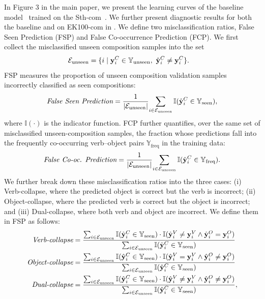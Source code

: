 In Figure 3 in the main paper, we present the learning curves of the baseline model~\cite{li2024c2c} trained on the Sth-com~\cite{li2024c2c}.
We further present diagnostic results for both the baseline and \ours{} on EK100-com in .
We define two misclassification ratios, False Seen Prediction (FSP) and False Co-occurrence Prediction (FCP).
We first collect the misclassified unseen composition samples into the set
\begin{align}
\mathcal{E}_{\mathrm{unseen}}
&= \{i \mid \mathbf{y}_i^C\in\mathbb{Y}_{\mathrm{unseen}},\ \hat{\mathbf{y}}_i^C\neq \mathbf{y}_i^C\}.
\end{align}
FSP measures the proportion of unseen composition validation samples incorrectly classified as seen compositions:
\begin{align}
\vspace{-3em}
\textit{False Seen Prediction}=\frac{1}{|\mathcal{E}_{\mathrm{unseen}}|}
{\sum_{i\in\mathcal{E}_{\mathrm{unseen}}}
\mathbb{I}(\hat{\y}^C_i \in \mathbb{Y}_{\text{seen}})},
\vspace{-.5em}
\end{align}
where $\mathbb{I}(\cdot)$ is the indicator function.
FCP further quantifies, over the same set of misclassified unseen-composition samples, the fraction whose predictions fall into the frequently co-occurring verb–object pairs $\mathbb{Y}_\text{freq}$ in the training data:
\begin{align}
\vspace{-1em}
\textit{False Co-oc. Prediction}=\frac{1}{|\mathcal{E}_{\mathrm{unseen}}|}{\sum_{i\in\mathcal{E}_{\mathrm{unseen}}} \mathbb{I}(\hat{\y}^C_i \in \mathbb{Y}_{\text{freq}})}.
\vspace{-1em}
\end{align}
We further break down these misclassification ratios into the three cases: (i) Verb-collapse, where the predicted object is correct but the verb is incorrect; (ii) Object-collapse, where the predicted verb is correct but the object is incorrect; and (iii) Dual-collapse, where both verb and object are incorrect.
We define them in FSP as follows:
\begin{align}
\textit{Verb-collapse}&=\frac{\sum_{i \in \mathcal{E}_{\mathrm{unseen}}} \mathbb{I}(\hat{\mathbf{y}}^C_i \in \mathbb{Y}_{\text{seen}}) \cdot \mathbb{I}(\hat{\mathbf{y}}^V_i \neq \mathbf{y}^V_i \land \hat{\mathbf{y}}^O_i = \mathbf{y}^O_i)}{\sum_{i \in \mathcal{E}_{\mathrm{unseen}}} \mathbb{I}(\hat{\mathbf{y}}^C_i \in \mathbb{Y}_{\text{seen}})}\\
\textit{Object-collapse}&=\frac{\sum_{i \in \mathcal{E}_{\mathrm{unseen}}} \mathbb{I}(\hat{\mathbf{y}}^C_i \in \mathbb{Y}_{\text{seen}}) \cdot \mathbb{I}(\hat{\mathbf{y}}^V_i = \mathbf{y}^V_i \land \hat{\mathbf{y}}^O_i \neq \mathbf{y}^O_i)}{\sum_{i \in \mathcal{E}_{\mathrm{unseen}}} \mathbb{I}(\hat{\mathbf{y}}^C_i \in \mathbb{Y}_{\text{seen}})}\\
\textit{Dual-collapse}&=\frac{\sum_{i \in \mathcal{E}_{\mathrm{unseen}}} \mathbb{I}(\hat{\mathbf{y}}^C_i \in \mathbb{Y}_{\text{seen}}) \cdot \mathbb{I}(\hat{\mathbf{y}}^V_i \neq \mathbf{y}^V_i \land \hat{\mathbf{y}}^O_i \neq \mathbf{y}^O_i)}{\sum_{i \in \mathcal{E}_{\mathrm{unseen}}} \mathbb{I}(\hat{\mathbf{y}}^C_i \in \mathbb{Y}_{\text{seen}})},
\end{align}
